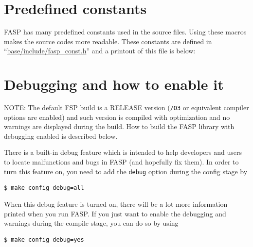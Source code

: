\documentclass[11pt]{memoir}
\begin{document}
\section{Predefined constants}\label{sec:const}

FASP has many predefined constants used in the source files. 
Using these macros makes the source codes more readable. 
These constants are defined in ``\url{base/include/fasp\_const.h}''
and a printout of this file is below:
%


\section{Debugging and how to enable it}\label{sec:debug}

\begin{snugshade}\noindent
  NOTE: The default FSP build is a RELEASE version (\verb|/O3| or equivalent 
  compiler options are enabled) and such version
  is compiled with optimization and no warnings are displayed during
  the build. How to build the FASP library with debugging enabled is
  described below.
\end{snugshade}
%
There is a built-in debug feature which is intended to help developers
and users to locate malfunctions and bugs in FASP (and hopefully fix
them). In order to turn this feature on, you need to add the
\verb|debug| option during the config stage by
%
\begin{lstlisting}[numbers=none]
$ make config debug=all
\end{lstlisting}
%
When this debug feature is turned on, there will be a lot more
information printed when you run FASP.  If you just want to enable the
debugging and warnings during the compile stage, you can do so by
using
%
\begin{lstlisting}[numbers=none]
$ make config debug=yes
\end{lstlisting}
%


\end{document}
